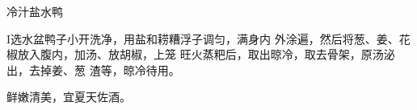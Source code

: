\begin{recipe}{冷汁盐水鸭}

\ingredients


\cooking

I选水盆鸭子小开洗净，用盐和耢糟浮子调匀，满身内 外涂遍，然后将葱、姜、花椒放入腹内，加汤、放胡椒，上笼 旺火蒸粑后，取出晾冷，取去骨架，原汤泌出，去掉姜、葱 渣等，晾冷待用。

\notes

鲜嫩清美，宜夏天佐酒。

\end{recipe}

